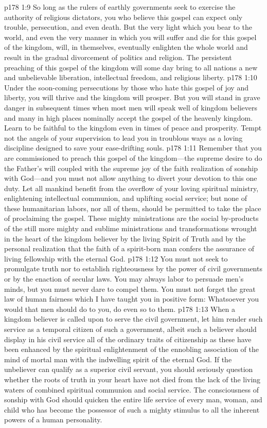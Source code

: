 \vs p178 1:9 So long as the rulers of earthly governments seek to exercise the authority of religious dictators, you who believe this gospel can expect only trouble, persecution, and even death. But the very light which you bear to the world, and even the very manner in which you will suffer and die for this gospel of the kingdom, will, in themselves, eventually enlighten the whole world and result in the gradual divorcement of politics and religion. The persistent preaching of this gospel of the kingdom will some day bring to all nations a new and unbelievable liberation, intellectual freedom, and religious liberty.
\vs p178 1:10 Under the soon\hyp{}coming persecutions by those who hate this gospel of joy and liberty, you will thrive and the kingdom will prosper. But you will stand in grave danger in subsequent times when most men will speak well of kingdom believers and many in high places nominally accept the gospel of the heavenly kingdom. Learn to be faithful to the kingdom even in times of peace and prosperity. Tempt not the angels of your supervision to lead you in troublous ways as a loving discipline designed to save your ease\hyp{}drifting souls.
\vs p178 1:11 Remember that you are commissioned to preach this gospel of the kingdom---the supreme desire to do the Father’s will coupled with the supreme joy of the faith realization of sonship with God---and you must not allow anything to divert your devotion to this one duty. Let all mankind benefit from the overflow of your loving spiritual ministry, enlightening intellectual communion, and uplifting social service; but none of these humanitarian labors, nor all of them, should be permitted to take the place of proclaiming the gospel. These mighty ministrations are the social by\hyp{}products of the still more mighty and sublime ministrations and transformations wrought in the heart of the kingdom believer by the living Spirit of Truth and by the personal realization that the faith of a spirit\hyp{}born man confers the assurance of living fellowship with the eternal God.
\vs p178 1:12 You must not seek to promulgate truth nor to establish righteousness by the power of civil governments or by the enaction of secular laws. You may always labor to persuade men’s minds, but you must never dare to compel them. You must not forget the great law of human fairness which I have taught you in positive form: Whatsoever you would that men should do to you, do even so to them.\plusone
\vs p178 1:13 When a kingdom believer is called upon to serve the civil government, let him render such service as a temporal citizen of such a government, albeit such a believer should display in his civil service all of the ordinary traits of citizenship as these have been enhanced by the spiritual enlightenment of the ennobling association of the mind of mortal man with the indwelling spirit of the eternal God. If the unbeliever can qualify as a superior civil servant, you should seriously question whether the roots of truth in your heart have not died from the lack of the living waters of combined spiritual communion and social service. The consciousness of sonship with God should quicken the entire life service of every man, woman, and child who has become the possessor of such a mighty stimulus to all the inherent powers of a human personality.\plusone
